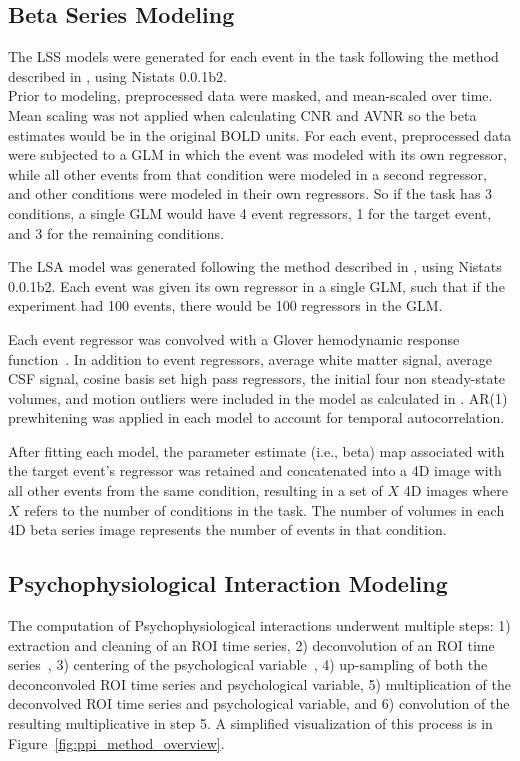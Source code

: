 \documentclass[phd,appendix,figures]{uithesis}
\begin{document}
\subsection*{Beta Series Modeling}
\label{methods:bsc_model2}

The LSS models were generated for each event in
the task following the method described in \cite[Turner (2012)]{Turner2012a}, using
Nistats 0.0.1b2.\\
Prior to modeling, preprocessed data were masked, and mean-scaled over
time.
Mean scaling was not applied when calculating CNR and AVNR so the
beta estimates would be in the original BOLD units.
For each event, preprocessed data were subjected to a GLM
in which the event was modeled with its own regressor, while
all other events from that condition were modeled in a second regressor,
and other conditions were modeled in their own regressors.
So if the task has 3 conditions, 
a single GLM would have 4 event regressors, 1 for the target
event, and 3 for the remaining conditions.

The LSA model was generated following the method described in
\cite[Rissman (2004)]{Rissman2004}, using Nistats 0.0.1b2.
Each event was given its own regressor in a single GLM, such that
if the experiment had 100 events, there would be 100 regressors in the GLM.

Each event regressor was convolved with a Glover hemodynamic response
function~\cite{Glover1999}.
In addition to event regressors, average white matter signal, average CSF signal,
cosine basis set high pass regressors, the initial four non steady-state volumes, 
and motion outliers were included
in the model as calculated in .
AR(1) prewhitening was applied in each model to account
for temporal autocorrelation.

After fitting each model, the parameter estimate (i.e., beta) map
associated with the target event's regressor was retained and
concatenated into a 4D image with all other events from the same
condition, resulting in a set of $X$ 4D images where $X$ refers to the
number of conditions in the task.
The number of volumes in each 4D beta series image
represents the number of events in that condition.


\subsection*{Psychophysiological Interaction Modeling}

The computation of Psychophysiological interactions underwent multiple steps:
1) extraction and cleaning of an ROI time series,
2) deconvolution of an ROI time series~\cite{Gitelman2003},
3) centering of the psychological variable~\cite{Di2017},
4) up-sampling of both the deconconvoled ROI time series and psychological variable,
5) multiplication of the deconvolved ROI time series and psychological variable, and
6) convolution of the resulting multiplicative in step 5.
A simplified visualization of this process is in Figure~\ref{fig:ppi_method_overview}.
\end{document}

